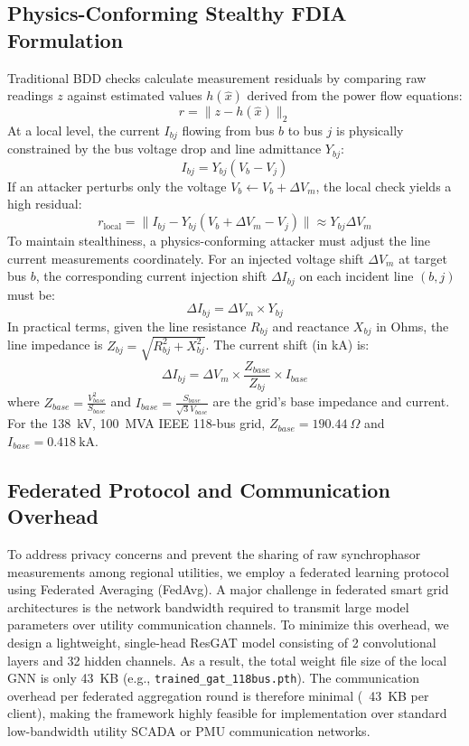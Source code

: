 \documentclass[conference]{IEEEtran}
\begin{document}
\subsection{Physics-Conforming Stealthy FDIA Formulation}
Traditional BDD checks calculate measurement residuals by comparing raw readings $z$ against estimated values $h(\hat{x})$ derived from the power flow equations:
\begin{equation}
r = \|z - h(\hat{x})\|_2
\end{equation}
At a local level, the current $I_{bj}$ flowing from bus $b$ to bus $j$ is physically constrained by the bus voltage drop and line admittance $Y_{bj}$:
\begin{equation}
I_{bj} = Y_{bj} (V_b - V_j)
\end{equation}
If an attacker perturbs only the voltage $V_b \leftarrow V_b + \Delta V_m$, the local check yields a high residual:
\begin{equation}
r_{\text{local}} = \|I_{bj} - Y_{bj} (V_b + \Delta V_m - V_j)\| \approx Y_{bj} \Delta V_m
\end{equation}
To maintain stealthiness, a physics-conforming attacker must adjust the line current measurements coordinately. For an injected voltage shift $\Delta V_m$ at target bus $b$, the corresponding current injection shift $\Delta I_{bj}$ on each incident line $(b, j)$ must be:
\begin{equation}
\Delta I_{bj} = \Delta V_m \times Y_{bj}
\end{equation}
In practical terms, given the line resistance $R_{bj}$ and reactance $X_{bj}$ in Ohms, the line impedance is $Z_{bj} = \sqrt{R_{bj}^2 + X_{bj}^2}$. The current shift (in kA) is:
\begin{equation}
\Delta I_{bj} = \Delta V_m \times \frac{Z_{base}}{Z_{bj}} \times I_{base}
\end{equation}
where $Z_{base} = \frac{V_{base}^2}{S_{base}}$ and $I_{base} = \frac{S_{base}}{\sqrt{3}V_{base}}$ are the grid's base impedance and current. For the 138~kV, 100~MVA IEEE 118-bus grid, $Z_{base} = 190.44\ \Omega$ and $I_{base} = 0.418\ \text{kA}$.

\subsection{Federated Protocol and Communication Overhead}
To address privacy concerns and prevent the sharing of raw synchrophasor measurements among regional utilities, we employ a federated learning protocol using Federated Averaging (FedAvg). A major challenge in federated smart grid architectures is the network bandwidth required to transmit large model parameters over utility communication channels. To minimize this overhead, we design a lightweight, single-head ResGAT model consisting of 2 convolutional layers and 32 hidden channels. As a result, the total weight file size of the local GNN is only 43~KB (e.g., \texttt{trained\_gat\_118bus.pth}). The communication overhead per federated aggregation round is therefore minimal (~43~KB per client), making the framework highly feasible for implementation over standard low-bandwidth utility SCADA or PMU communication networks.
\end{document}
